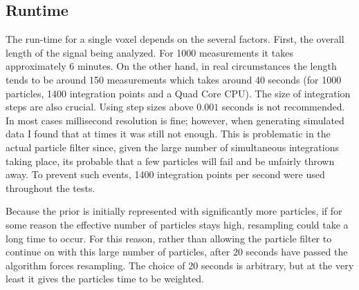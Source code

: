 \subsection{Runtime}
The run-time for a single voxel depends on the several factors. First, the
overall length of the signal being analyzed. For 1000 measurements it takes
approximately 6 minutes. On the other hand, in real circumstances the
length tends to be around 150 measurements which takes around 40 seconds (for 1000
particles, 1400 integration points and a Quad Core CPU). The size of
integration steps are also crucial. Using step sizes above
$0.001$ seconds is not recommended. In most cases millisecond resolution
is fine; however, when generating simulated data I found that at times it was
still not enough. This is problematic in the actual particle
filter since, given the large number of simultaneous integrations taking
place, its probable that a few particles will fail and be unfairly thrown away.
To prevent such events, 1400 integration points per second were used throughout
the tests.

Because the prior is initially represented with significantly more
particles, if for some reason the effective
number of particles stays high, resampling could take a long time to occur.
For this reason, rather than allowing the particle filter to continue on
with this large number of particles, after 20 seconds have passed the
algorithm forces resampling. The choice of 20 seconds is
arbitrary, but at the very least it gives the particles time to be weighted.

